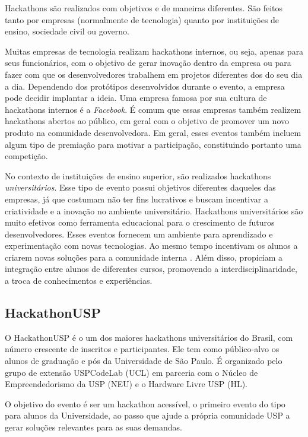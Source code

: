 \documentclass[10pt,twoside,a4paper]{article}
\begin{document}
    Hackathons são realizados com objetivos e de maneiras diferentes. São feitos tanto por empresas (normalmente de tecnologia) quanto por instituições de ensino, sociedade civil ou governo.
    
    Muitas empresas de tecnologia realizam hackathons internos, ou seja, apenas para seus funcionários, com o objetivo de gerar inovação dentro da empresa ou para fazer com que os desenvolvedores trabalhem em projetos diferentes dos do seu dia a dia. Dependendo dos protótipos desenvolvidos durante o evento, a empresa pode decidir implantar a ideia. Uma empresa famosa por sua cultura de hackathons internos é a \textit{Facebook}. É comum que essas empresas também realizem hackathons abertos ao público, em geral com o objetivo de promover um novo produto na comunidade desenvolvedora. Em geral, esses eventos também incluem algum tipo de premiação para motivar a participação, constituindo portanto uma competição.
    
    No contexto de instituições de ensino superior, são realizados hackathons \textit{universitários}. Esse tipo de evento possui objetivos diferentes daqueles das empresas, já que costumam não ter fins lucrativos e buscam incentivar a criatividade e a inovação no ambiente universitário. Hackathons universitários são muito efetivos como ferramenta educacional para o crescimento de futuros desenvolvedores. Esses eventos fornecem um ambiente para aprendizado e experimentação com novas tecnologias. Ao mesmo tempo incentivam os alunos a criarem novas soluções para a comunidade interna \cite{Kayastha2017EnablingCompetition}. Além disso, propiciam a integração entre alunos de diferentes cursos, promovendo a interdisciplinaridade, a troca de conhecimentos e experiências.

  \subsection{HackathonUSP}
    
    O HackathonUSP é o um dos maiores hackathons universitários do Brasil, com número crescente de inscritos e participantes. Ele tem como  público-alvo os alunos de graduação e pós da Universidade de São Paulo. É organizado pelo grupo de extensão USPCodeLab (UCL) em parceria com o Núcleo de Empreendedorismo da USP (NEU) e o Hardware Livre USP (HL).
    
    O objetivo do evento é ser um hackathon acessível, o primeiro evento do tipo para alunos da Universidade, ao passo que ajude a própria comunidade USP a gerar soluções relevantes para as suas demandas.
    
\end{document}
